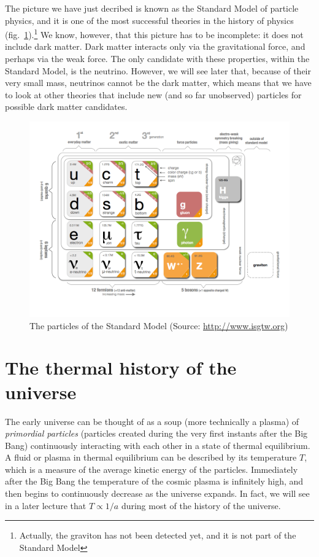 \documentclass[11pt, a4paper,oneside,openright]{book}
\numberwithin{equation}{section}
\begin{document}
The picture we have just decribed is known as the Standard Model of particle physics, and it is one of the most successful theories in the history of physics (fig.\ \ref{fig:lec6_5}).\footnote{Actually, the graviton has not been detected yet, and it is not part of the Standard Model} We know, however, that this picture has to be incomplete: it does not include dark matter. Dark matter interacts only via the gravitational force, and perhaps via the weak force. The only candidate with these properties, within the Standard Model, is the neutrino. However, we will see later that, because of their very small mass, neutrinos cannot be the dark matter, which means that we have to look at other theories that include new (and so far unobserved) particles for possible dark matter candidates.
\begin{figure}[ht]
\begin{center}
\includegraphics[scale=0.35]{Draw/lec6_5.png}
\end{center}
\caption{The particles of the Standard Model (Source: \url{http://www.isgtw.org})}
\label{fig:lec6_5}
\end{figure}

\section{The thermal history of the universe}
\label{chp7}

The early universe can be thought of as a soup (more technically a plasma) of {\it primordial particles} (particles created during the very first instants after the Big Bang) continuously interacting with each other in a state of thermal equilibrium. A fluid or plasma in thermal equilibrium can be described by its temperature $T$, which is a measure of the average kinetic energy of the particles. Immediately after the Big Bang the temperature of the cosmic plasma is infinitely high, and then begins to continuously decrease as the universe expands. In fact, we will see in a later lecture that $T\propto 1/a$ during most of the history of the universe.
\end{document}
